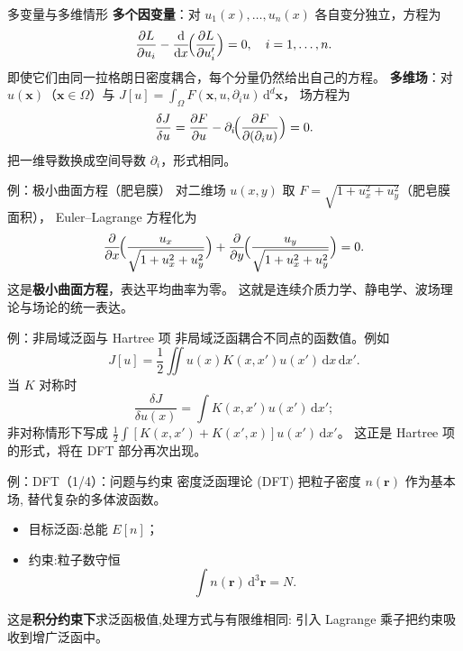\documentclass[fontset=windows, chinese, 10pt, xcolor=dvipsnames]{beamer}
\begin{document}
\begin{frame}{多变量与多维情形}
  \textbf{多个因变量}：对 $u_1(x),\dots,u_n(x)$ 各自变分独立，方程为
  \begin{equation*}
    \frac{\partial L}{\partial u_i}
    - \frac{\mathrm{d}}{\mathrm{d}x}\!\Bigl(\frac{\partial L}{\partial u_i'}\Bigr) = 0,
    \quad i=1,\dots,n.
  \end{equation*}
  即使它们由同一拉格朗日密度耦合，每个分量仍然给出自己的方程。
  \textbf{多维场}：对 $u(\mathbf{x})$（$\mathbf{x}\in\Omega$）与
  $J[u]=\int_\Omega F(\mathbf{x},u,\partial_i u)\,\mathrm{d}^d\mathbf{x}$，
  场方程为
  \begin{equation*}
    \frac{\delta J}{\delta u}
    = \frac{\partial F}{\partial u}
      - \partial_i\!\Bigl(\frac{\partial F}{\partial(\partial_i u)}\Bigr) = 0.
  \end{equation*}
  把一维导数换成空间导数 $\partial_i$，形式相同。
\end{frame}

\begin{frame}{例：极小曲面方程（肥皂膜）}
  对二维场 $u(x,y)$ 取 $F=\sqrt{1+u_x^2+u_y^2}$（肥皂膜面积），
  Euler--Lagrange 方程化为
  \begin{equation*}
    \frac{\partial}{\partial x}\!\Bigl(\frac{u_x}{\sqrt{1+u_x^2+u_y^2}}\Bigr)
    +\frac{\partial}{\partial y}\!\Bigl(\frac{u_y}{\sqrt{1+u_x^2+u_y^2}}\Bigr)
    = 0.
  \end{equation*}
  这是\textbf{极小曲面方程}，表达平均曲率为零。
  这就是连续介质力学、静电学、波场理论与场论的统一表达。
\end{frame}

\begin{frame}{例：非局域泛函与 Hartree 项}
  非局域泛函耦合不同点的函数值。例如
  \begin{equation*}
    J[u]=\frac12\iint u(x)K(x,x')u(x')\,\mathrm{d}x\,\mathrm{d}x'.
  \end{equation*}
  当 $K$ 对称时
  \begin{equation*}
    \frac{\delta J}{\delta u(x)} = \int K(x,x')u(x')\,\mathrm{d}x';
  \end{equation*}
  非对称情形下写成 $\frac12\int[K(x,x')+K(x',x)]u(x')\,\mathrm{d}x'$。
  这正是 Hartree 项的形式，将在 DFT 部分再次出现。
\end{frame}

\begin{frame}{例：DFT（1/4）：问题与约束}
  密度泛函理论 (DFT) 把粒子密度 $n(\mathbf{r})$ 作为基本场,
  替代复杂的多体波函数。
  \begin{itemize}
    \item 目标泛函:总能 $E[n]$；
    \item 约束:粒子数守恒
      \begin{equation*}
        \int n(\mathbf{r})\,\mathrm{d}^3\mathbf{r} = N.
      \end{equation*}
  \end{itemize}
  这是\textbf{积分约束下}求泛函极值,处理方式与有限维相同:
  引入 Lagrange 乘子把约束吸收到增广泛函中。
\end{frame}
\end{document}
